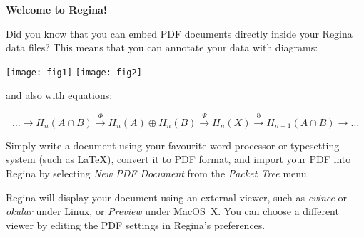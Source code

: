 \documentclass[a4paper,10pt]{article}
\begin{document}
\thispagestyle{empty}
\centerline{\large \bf{Welcome to Regina!}}

\bigskip

Did you know that you can embed PDF documents directly inside your
Regina data files?
This means that you can annotate your data with diagrams:

\bigskip

\centerline{
    \texttt{[image: fig1]}\qquad\qquad
    \texttt{[image: fig2]}}

\medskip

\noindent
and also with equations:

\[ \ldots
    \longrightarrow H_n(A \cap B)
    \stackrel{\Phi}{\longrightarrow} H_n(A) \oplus H_n(B)
    \stackrel{\Psi}{\longrightarrow} H_n(X)
    \stackrel{\partial}{\longrightarrow} H_{n-1}(A \cap B)
    \longrightarrow \ldots
\]

Simply write a document using your favourite word processor or
typesetting system (such as \LaTeX), convert it to PDF format, and import
your PDF into Regina by selecting \emph{New PDF Document} from the
\emph{Packet Tree} menu.

Regina will display your document using an external viewer, such as
\emph{evince} or \emph{okular} under Linux, or \emph{Preview} under
MacOS~X.  You can choose a different viewer by editing the PDF settings
in Regina's preferences.
\end{document}
